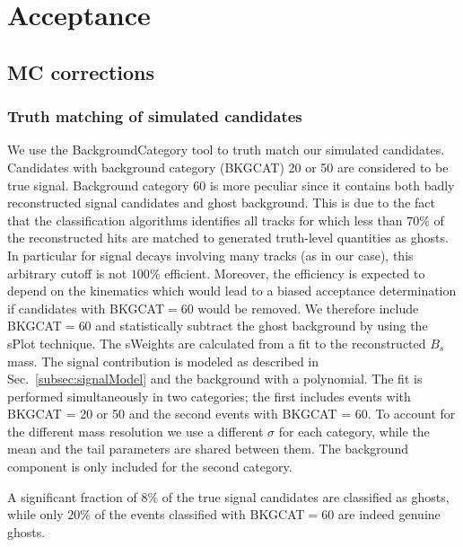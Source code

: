 \section{Acceptance}
\label{sec:Acceptance}

\subsection{MC corrections}

\subsubsection{Truth matching of simulated candidates}

We use the \textsf{BackgroundCategory} tool to truth match our simulated candidates. 
Candidates with background category (\textsf{BKGCAT}) 20 or 50 are considered to be true signal. 
Background category 60 is more peculiar since it contains both badly reconstructed
signal candidates and ghost background.
This is due to the fact that the classification algorithms identifies all tracks 
for which less than $70\%$ of the reconstructed hits are matched to generated truth-level quantities as ghosts.
In particular for signal decays involving many tracks (as in our case),
this arbitrary cutoff is not $100\%$ efficient.
Moreover, the efficiency is expected to depend on the kinematics which would lead to a biased acceptance determination
if candidates with \textsf{BKGCAT}$=60$ would be removed. 
We therefore include \textsf{BKGCAT}$=60$ and statistically subtract the ghost background by using the \textsf{sPlot} technique.
The \textsf{sWeights} are calculated from a fit to the reconstructed $B_s$ mass.  
The signal contribution is modeled as described in Sec.~\ref{subsec:signalModel} and the background with a polynomial.
The fit is performed simultaneously in two categories; the first includes events with \textsf{BKGCAT} = 20 or 50 and
the second events with \textsf{BKGCAT}  = 60.
To account for the different mass resolution we use a different $\sigma$ for each category,
while the mean and the tail parameters are shared between them. 
The background component is only included for the second category.

A significant fraction of $8\%$ of the true signal candidates are classified as ghosts,
while only $20 \%$ of the events classified with \textsf{BKGCAT}$=60$ are indeed genuine ghosts.


